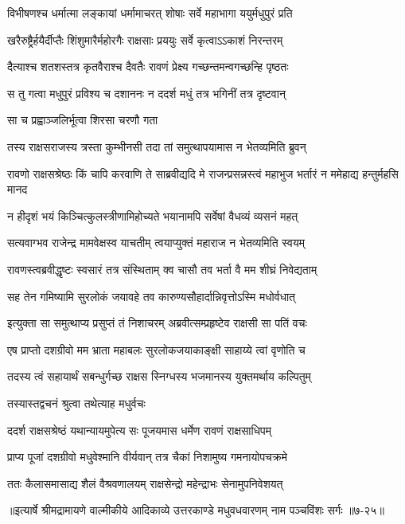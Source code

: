 \twolineshloka
{विभीषणश्च धर्मात्मा लङ्कायां धर्मामाचरत्}
{शोषाः सर्वे महाभागा ययुर्मधुपुरं प्रति} %

\twolineshloka
{खरैरुष्ट्रैर्हयैर्दीप्तैः शिंशुमारैर्महोरगैः}
{राक्षसाः प्रययुः सर्वे कृत्वाऽऽकाशं निरन्तरम्} %

\twolineshloka
{दैत्याश्च शतशस्तत्र कृतवैराश्च दैवतैः}
{रावणं प्रेक्ष्य गच्छन्तमन्वगच्छन्हि पृष्ठतः} %

\twolineshloka
{स तु गत्वा मधुपुरं प्रविश्य च दशाननः}
{न ददर्श मधुं तत्र भगिनीं तत्र दृष्टवान्} %

\onelineshloka
{सा च प्रह्वाञ्जलिर्भूत्वा शिरसा चरणौ गता} %

\twolineshloka
{तस्य राक्षसराजस्य त्रस्ता कुम्भीनसी तदा}
{तां समुत्थापयामास न भेतव्यमिति ब्रुवन्} %

\threelineshloka
{रावणो राक्षसश्रेष्ठः किं चापि करवाणि ते}
{साब्रवीद्यदि मे राजन्प्रसन्नस्त्वं महाभुज}
{भर्तारं न ममेहाद्य हन्तुर्महसि मानद} %

\twolineshloka
{न हीदृशं भयं किञ्चित्कुलस्त्रीणामिहोच्यते}
{भयानामपि सर्वेषां वैधव्यं व्यसनं महत्} %

\twolineshloka
{सत्यवाग्भव राजेन्द्र मामवेक्षस्व याचतीम्}
{त्वयाप्युक्तं महाराज न भेतव्यमिति स्वयम्} %

\twolineshloka
{रावणस्त्वब्रवीद्धृष्टः स्वसारं तत्र संस्थिताम्}
{क्व चासौ तव भर्ता वै मम शीघ्रं निवेद्यताम्} %

\twolineshloka
{सह तेन गमिष्यामि सुरलोकं जयावहे}
{तव कारुण्यसौहार्दान्निवृत्तोऽस्मि मधोर्वधात्} %

\twolineshloka
{इत्युक्ता सा समुत्थाप्य प्रसुप्तं तं निशाचरम्}
{अब्रवीत्सम्प्रहृष्टेव राक्षसी सा पतिं वचः} %

\twolineshloka
{एष प्राप्तो दशग्रीवो मम भ्राता महाबलः}
{सुरलोकजयाकाङ्क्षी साहाय्ये त्वां वृणोति च} %

\twolineshloka
{तदस्य त्वं सहायार्थं सबन्धुर्गच्छ राक्षस}
{स्निग्धस्य भजमानस्य युक्तमर्थाय कल्पितुम्} %

\onelineshloka
{तस्यास्तद्वचनं श्रुत्वा तथेत्याह मधुर्वचः} %

\twolineshloka
{ददर्श राक्षसश्रेष्ठं यथान्यायमुपेत्य सः}
{पूजयमास धर्मेण रावणं राक्षसाधिपम्} %

\twolineshloka
{प्राप्य पूजां दशग्रीवो मधुवेश्मानि वीर्यवान्}
{तत्र चैकां निशामुष्य गमनायोपचक्रमे} %

\twolineshloka
{ततः कैलासमासाद्य शैलं वैश्रवणालयम्}
{राक्षसेन्द्रो महेन्द्राभः सेनामुपनिवेशयत्} %


॥इत्यार्षे श्रीमद्रामायणे वाल्मीकीये आदिकाव्ये उत्तरकाण्डे मधुवधवारणम् नाम पञ्चविंशः सर्गः ॥७-२५॥
